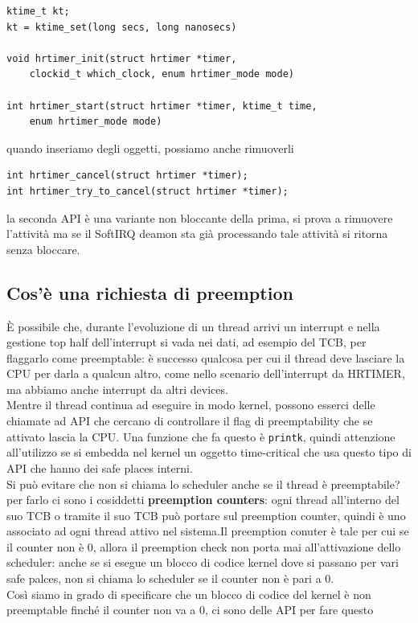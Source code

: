 \documentclass[12pt, oneside]{extbook}
\begin{document}
\begin{lstlisting}
ktime_t kt;
kt = ktime_set(long secs, long nanosecs)

void hrtimer_init(struct hrtimer *timer, 
	clockid_t which_clock, enum hrtimer_mode mode)
	
int hrtimer_start(struct hrtimer *timer, ktime_t time, 
	enum hrtimer_mode mode)
\end{lstlisting}
quando inseriamo degli oggetti, possiamo anche rimuoverli
\begin{lstlisting}
int hrtimer_cancel(struct hrtimer *timer);
int hrtimer_try_to_cancel(struct hrtimer *timer);
\end{lstlisting}
la seconda API è una variante non bloccante della prima, si prova a rimuovere l'attività ma se il SoftIRQ deamon sta già processando tale attività si ritorna senza bloccare.
\subsection{Cos'è una richiesta di preemption}
È possibile che, durante l'evoluzione di un thread arrivi un interrupt e nella gestione top half dell'interrupt si vada nei dati, ad esempio del TCB, per flaggarlo come preemptable: è successo qualcosa per cui il thread deve lasciare la CPU per darla a qualcun altro, come nello scenario dell'interrupt da HRTIMER, ma abbiamo anche interrupt da altri devices.\\Mentre il thread continua ad eseguire in modo  kernel, possono esserci delle chiamate ad API che cercano di controllare il flag di preemptability che se attivato lascia la CPU. Una funzione che fa questo è \texttt{printk}, quindi attenzione all'utilizzo se si embedda nel kernel un oggetto time-critical che usa questo tipo di API che hanno dei safe places interni.\\Si può evitare che non si chiama lo scheduler anche se il thread è preemptabile? per farlo ci sono i cosiddetti \textbf{preemption counters}: ogni thread all'interno del suo TCB o tramite il suo TCB può portare sul preemption counter, quindi è uno associato ad ogni thread attivo nel sistema.Il preemption conuter è tale per cui se il counter non è 0, allora il preemption check non porta mai all'attivazione dello scheduler: anche se si esegue un blocco di codice kernel dove si passano per vari safe palces, non si chiama lo scheduler se il counter non è pari a 0.\\Così siamo in grado di specificare che un blocco di codice del kernel è non preemptable finché il counter non va a 0, ci sono delle API per fare questo
\end{document}
